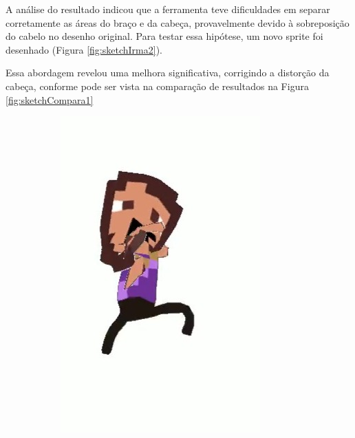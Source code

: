 A análise do resultado indicou que a ferramenta teve dificuldades em separar corretamente as áreas do braço e da cabeça, provavelmente devido à sobreposição do cabelo no desenho original. Para testar essa hipótese, um novo sprite foi desenhado (Figura \ref{fig:sketchIrma2}).

Essa abordagem revelou uma melhora significativa, corrigindo a distorção da cabeça, conforme pode ser vista na comparação de resultados na Figura \ref{fig:sketchCompara1}


\begin{figure}[htbp]
    \centering
    \caption{\small Comparando frames correspondentes}
    \label{fig:sketchCompara1}
    \begin{subfigure}{0.35\linewidth}
        \includegraphics[width=1\linewidth]{figs/sketchLab/irma1_frame2.jpg}

\end{subfigure}
\end{figure}
